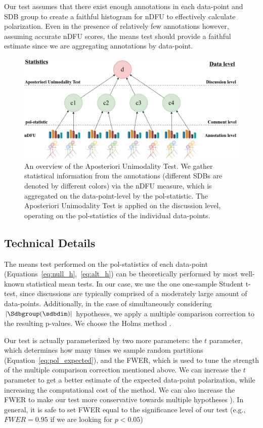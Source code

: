\documentclass{article}
\begin{document}
Our test assumes that there exist enough annotations in each data-point and \ac{SDB} group to create a faithful histogram for \ac{nDFU} to effectively calculate polarization. Even in the presence of relatively few annotations however, assuming accurate \ac{nDFU} scores, the means test should provide a faithful estimate since we are aggregating annotations by data-point.

\begin{figure}
	\includegraphics[width=\linewidth]{overview.png}
	\caption{An overview of the Aposteriori Unimodality Test. We gather statistical information from the annotations (different \acp{SDB} are denoted by different colors) via the \ac{nDFU} measure, which is aggregated on the data-point-level by the pol-statistic. The Aposteriori Unimodality Test is applied on the discussion level, operating on the pol-statistics of the individual data-points.}
	\label{fig::overview}
\end{figure}


\subsection{Technical Details}
\label{ssec:methodology:details}

The means test performed on the pol-statistics of each data-point (Equations~\ref{eq:null_h},~\ref{eq:alt_h}) can be theoretically performed by most well-known statistical mean tests. In our case, we use the one one-sample Student t-test, since discussions are typically comprised of a moderately large amount of data-points. Additionally, in the case of simultaneously considering $\lvert \Sdbgroup(\sdbdim) \rvert$ hypotheses, we apply a multiple comparison correction to the resulting p-values. We choose the Holms method \parencite{holms}.

Our test is actually parameterized by two more parameters: the $t$ parameter, which determines how many times we sample random partitions (Equation~\ref{eq:pol_expected}), and the \ac{FWER}, which is used to tune the strength of the multiple comparison correction mentioned above. We can increase the $t$ parameter to get a better estimate of the expected data-point polarization, while increasing the computational cost of the method. We can also increase the \ac{FWER} to make our test more conservative towards multiple hypotheses \parencite{ChenFengYi2017}). In general, it is safe to set \ac{FWER} equal to the significance level of our test (e.g., $\textit{FWER} = 0.95$ if we are looking for $p < 0.05$)
\end{document}
